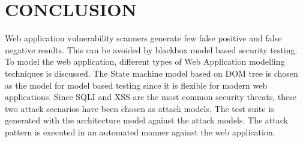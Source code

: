 
\chapter{CONCLUSION}

Web application vulnerability scanners generate few false positive and false negative results. This can be avoided by blackbox model based security testing. To model the web application, different types of Web Application modelling techniques is discussed. The State machine model based on DOM tree is chosen as the model for model based testing since it is flexible for modern web applications. Since SQLI and XSS are the most common security threats, these two attack scenarios have been chosen as attack models. The test suite is generated with the architecture model against the attack models. The attack pattern is executed in an automated manner against the web application.
